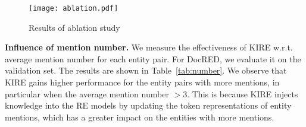 \documentclass[runningheads]{llncs}
\begin{document}
\begin{figure}[!tb]
	\centering
	\texttt{[image: ablation.pdf]}
	\caption{Results of ablation study}
	\label{fig:ablation}
\end{figure}


\textbf{Influence of mention number.} We measure the effectiveness of KIRE w.r.t. average mention number for each entity pair. 
For DocRED, we evaluate it on the validation set.
The results are shown in Table~\ref{tab:number}. 
We observe that KIRE gains higher performance for the entity pairs with more mentions, in particular when the average mention number $> 3$.
This is because KIRE injects knowledge into the RE models by updating the token representations of entity mentions, which has a greater impact on the entities with more mentions.
\end{document}
